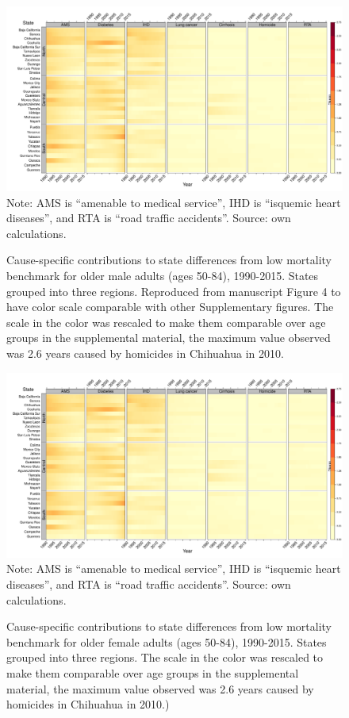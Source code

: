 \documentclass[11.5pt]{article}
\begin{document}
{\begin{figure}[h!]
\centering
\caption{Cause-specific contributions to state differences from low mortality benchmark for older male adults (ages 50-84), 1990-2015. States grouped into three regions. Reproduced from manuscript Figure 4 to have color scale comparable with other Supplementary figures. The scale in the color was rescaled to make them comparable over age groups in the supplemental material, the maximum value observed was 2.6 years caused by homicides in Chihuahua in 2010.}
\label{fig:e40_74_males}
\includegraphics[scale=.31]{Adult_Female_heatmap.pdf}
Note: AMS is ``amenable to medical service'', IHD is ``isquemic heart diseases'', and RTA is ``road traffic accidents''. Source: own calculations. \end{figure}

\begin{figure}[h!]
\centering
\caption{Cause-specific contributions to state differences from low mortality benchmark for older female adults (ages 50-84), 1990-2015. States grouped into three regions. The scale in the color was rescaled to make them comparable over age groups in the supplemental material, the maximum value observed was 2.6 years caused by homicides in Chihuahua in 2010.)}
\label{fig:e40_74_females}
\includegraphics[scale=.31]{Adult_Female_heatmap.pdf}
Note: AMS is ``amenable to medical service'', IHD is ``isquemic heart diseases'', and RTA is ``road traffic accidents''. Source: own calculations. \end{figure}


}
\end{document}
